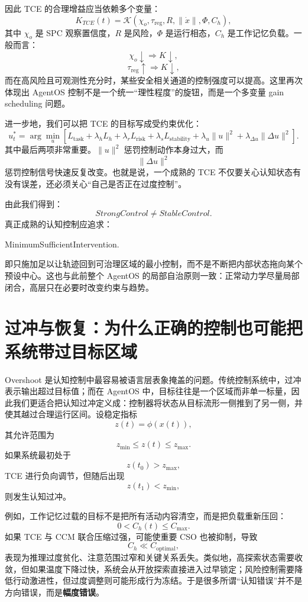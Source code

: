 因此 TCE 的合理增益应当依赖多个变量：
\[
K_{TCE}(t)
=
\mathcal K
\left(
\chi_o,
\tau_{\mathrm{reg}},
R,
\|\dot{x}\|,
\Phi,
C_h
\right),
\]
其中 $\chi_o$ 是 SPC 观察置信度，$R$ 是风险，$\Phi$ 是运行相态，$C_h$ 是工作记忆负载。一般而言：
\[
\chi_o\downarrow
\Rightarrow
K\downarrow,
\]
\[
\tau_{\mathrm{reg}}\uparrow
\Rightarrow
K\downarrow,
\]
而在高风险且可观测性充分时，某些安全相关通道的控制强度可以提高。这里再次体现出 AgentOS 控制不是一个统一“理性程度”的旋钮，而是一个多变量 gain scheduling 问题。

进一步地，我们可以把 TCE 的目标写成受约束优化：
\[
u_t^{*}
=
\arg\min_{u}
\left[
L_{\mathrm{task}}
+
\lambda_h L_h
+
\lambda_r L_{\mathrm{risk}}
+
\lambda_s L_{\mathrm{stability}}
+
\lambda_u \|u\|^2
+
\lambda_{\Delta u}\|\Delta u\|^2
\right].
\]
其中最后两项非常重要。$\|u\|^2$ 惩罚控制动作本身过大，而
\[
\|\Delta u\|^2
\]
惩罚控制信号快速反复改变。也就是说，一个成熟的 TCE 不仅要关心认知状态有没有误差，还必须关心“自己是否正在过度控制”。

由此我们得到：
\[
\boxed{
StrongControl
\neq
StableControl.
}
\]
真正成熟的认知控制应追求：
\begin{statementbox}
MinimumSufficientIntervention.
\end{statementbox}
即只施加足以让轨迹回到可治理区域的最小控制，而不是不断把内部状态拖向某个预设中心。这也与此前整个 AgentOS 的局部自治原则一致：正常动力学尽量局部闭合，高层只在必要时改变约束与趋势。

\section{过冲与恢复：为什么正确的控制也可能把系统带过目标区域}

Overshoot 是认知控制中最容易被语言层表象掩盖的问题。传统控制系统中，过冲表示输出超过目标值；而在 AgentOS 中，目标往往是一个区域而非单一标量，因此我们更适合把认知过冲定义成：控制器将状态从目标流形一侧推到了另一侧，并使其越过合理运行区间。设稳定指标
\[
z(t)
=
\phi(x(t)),
\]
其允许范围为
\[
z_{\min}
\le z(t)\le
z_{\max}.
\]
如果系统最初处于
\[
z(t_0)>z_{\max},
\]
TCE 进行负向调节，但随后出现
\[
z(t_1)<z_{\min},
\]
则发生认知过冲。

例如，工作记忆过载的目标不是把所有活动内容清空，而是把负载重新压回：
\[
0<C_h(t)\le C_{\max}.
\]
如果 TCE 与 CCM 联合压缩过强，可能使重要 CSO 也被抑制，导致
\[
C_h\ll C_{\mathrm{optimal}},
\]
表现为推理过度贫化、注意范围过窄和关键关系丢失。类似地，高探索状态需要收敛，但如果温度下降过快，系统会从开放探索直接进入过早锁定；风险控制需要降低行动激进性，但过度调整则可能形成行为冻结。于是很多所谓“认知错误”并不是方向错误，而是\textbf{幅度错误}。

